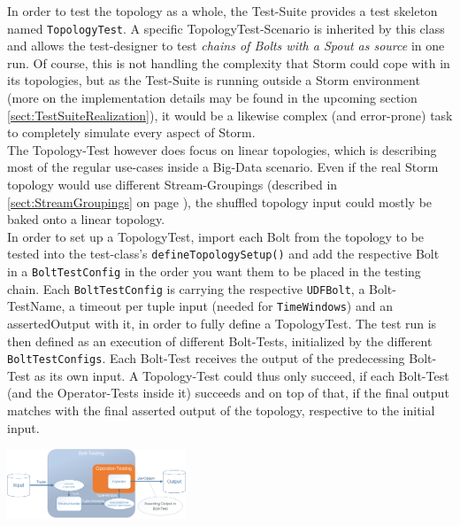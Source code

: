 \begin{description}
		In order to test the topology as a whole, the Test-Suite provides a test skeleton named \texttt{TopologyTest}. A specific TopologyTest-Scenario is inherited by this class and allows the test-designer to test \textit{chains of Bolts with a Spout as source} in one run. Of course, this is not handling the complexity that Storm could cope with in its topologies, but as the Test-Suite is running outside a Storm environment (more on the implementation details may be found in the upcoming section \ref{sect:TestSuiteRealization}), it would be a likewise complex (and error-prone) task to completely simulate every aspect of Storm.\\
		The Topology-Test however does focus on linear topologies, which is describing most of the regular use-cases inside a Big-Data scenario. Even if the real Storm topology would use different Stream-Groupings (described in \ref{sect:StreamGroupings} on page \pageref{StreamGroupings}), the shuffled topology input could mostly be baked onto a linear topology. \\
		In order to set up a TopologyTest, import each Bolt from the topology to be tested into the test-class's \texttt{defineTopologySetup()} and add the respective Bolt in a \texttt{BoltTestConfig} in the order you want them to be placed in the testing chain. Each \texttt{BoltTestConfig} is carrying the respective \texttt{UDFBolt}, a Bolt-TestName, a timeout per tuple input (needed for \texttt{TimeWindows}) and an assertedOutput with it, in order to fully define a TopologyTest. The test run is then defined as an execution of different Bolt-Tests, initialized by the different \texttt{BoltTestConfigs}. Each Bolt-Test receives the output of the predecessing Bolt-Test as its own input. A Topology-Test could thus only succeed, if each Bolt-Test (and the Operator-Tests inside it) succeeds and on top of that, if the final output matches with the final asserted output of the topology, respective to the initial input.
		\begin{center}
			\includegraphics[width=0.4\textwidth]{./images/09_testing/BoltTests.png}
		\end{center}
		
	\end{description}

